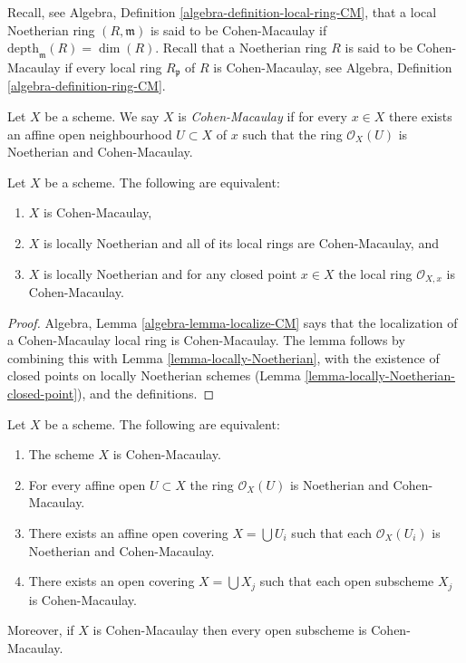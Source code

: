\noindent
Recall, see Algebra, Definition \ref{algebra-definition-local-ring-CM},
that a local Noetherian ring $(R, \mathfrak m)$ is
said to be Cohen-Macaulay if $\text{depth}_{\mathfrak m}(R) = \dim(R)$.
Recall that a Noetherian ring $R$ is said to be Cohen-Macaulay if
every local ring $R_{\mathfrak p}$ of $R$ is Cohen-Macaulay,
see Algebra, Definition \ref{algebra-definition-ring-CM}.

\begin{definition}
\label{definition-Cohen-Macaulay}
Let $X$ be a scheme. We say $X$ is {\it Cohen-Macaulay} if
for every $x \in X$ there exists an affine open neighbourhood
$U \subset X$ of $x$ such that the ring $\mathcal{O}_X(U)$ is
Noetherian and Cohen-Macaulay.
\end{definition}

\begin{lemma}
\label{lemma-characterize-Cohen-Macaulay}
Let $X$ be a scheme. The following are equivalent:
\begin{enumerate}
\item $X$ is Cohen-Macaulay,
\item $X$ is locally Noetherian and all of its local rings are Cohen-Macaulay,
and
\item $X$ is locally Noetherian and for any closed point $x \in X$
the local ring $\mathcal{O}_{X, x}$ is Cohen-Macaulay.
\end{enumerate}
\end{lemma}

\begin{proof}
Algebra, Lemma \ref{algebra-lemma-localize-CM} says that the localization of
a Cohen-Macaulay local ring is Cohen-Macaulay. The lemma follows
by combining this with Lemma \ref{lemma-locally-Noetherian},
with the existence of closed
points on locally Noetherian schemes
(Lemma \ref{lemma-locally-Noetherian-closed-point}), and
the definitions.
\end{proof}

\begin{lemma}
\label{lemma-locally-Cohen-Macaulay}
Let $X$ be a scheme. The following are equivalent:
\begin{enumerate}
\item The scheme $X$ is Cohen-Macaulay.
\item For every affine open $U \subset X$ the ring $\mathcal{O}_X(U)$
is Noetherian and Cohen-Macaulay.
\item There exists an affine open covering $X = \bigcup U_i$ such that
each $\mathcal{O}_X(U_i)$ is Noetherian and Cohen-Macaulay.
\item There exists an open covering $X = \bigcup X_j$
such that each open subscheme $X_j$ is Cohen-Macaulay.
\end{enumerate}
Moreover, if $X$ is Cohen-Macaulay then every open subscheme
is Cohen-Macaulay.
\end{lemma}

